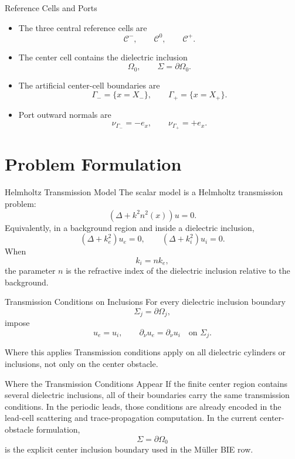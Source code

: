 \documentclass[aspectratio=169]{beamer}
\newcommand{\Ccell}{\mathcal C}
\begin{document}
\begin{frame}{Reference Cells and Ports}
  \begin{itemize}
    \item The three central reference cells are
    \[
      \Ccell^-, \qquad \Ccell^0, \qquad \Ccell^+ .
    \]
    \item The center cell contains the dielectric inclusion
    \[
      \Omega_0, \qquad \Sigma=\partial\Omega_0 .
    \]
    \item The artificial center-cell boundaries are
    \[
      \Gamma_-=\{x=X_-\}, \qquad
      \Gamma_+=\{x=X_+\}.
    \]
    \item Port outward normals are
    \[
      \nu_{\Gamma_-}=-e_x, \qquad \nu_{\Gamma_+}=+e_x .
    \]
  \end{itemize}
\end{frame}

\section{Problem Formulation}

\begin{frame}{Helmholtz Transmission Model}
  The scalar model is a Helmholtz transmission problem:
  \[
    (\Delta+k^2n^2(x))u=0.
  \]
  Equivalently, in a background region and inside a dielectric inclusion,
  \[
    (\Delta+k_e^2)u_e=0,
    \qquad
    (\Delta+k_i^2)u_i=0.
  \]
  When
  \[
    k_i=n k_e,
  \]
  the parameter \(n\) is the refractive index of the dielectric inclusion relative to the background.
\end{frame}

\begin{frame}{Transmission Conditions on Inclusions}
  For every dielectric inclusion boundary
  \[
    \Sigma_j=\partial\Omega_j,
  \]
  impose
  \[
    u_e=u_i,
    \qquad
    \partial_\nu u_e=\partial_\nu u_i
    \quad \text{on } \Sigma_j.
  \]
  \begin{block}{Where this applies}
    Transmission conditions apply on all dielectric cylinders or inclusions, not only on the center obstacle.
  \end{block}
\end{frame}

\begin{frame}{Where the Transmission Conditions Appear}
  If the finite center region contains several dielectric inclusions, all of their boundaries carry the same transmission conditions.
  In the periodic leads, those conditions are already encoded in the lead-cell scattering and trace-propagation computation.
  In the current center-obstacle formulation,
  \[
    \Sigma=\partial\Omega_0
  \]
  is the explicit center inclusion boundary used in the M\"uller BIE row.
\end{frame}
\end{document}
